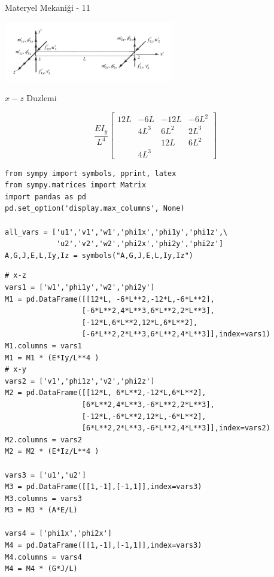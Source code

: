 \documentclass[12pt,fleqn]{article}\usepackage{../../common}
\begin{document}
Materyel Mekaniği - 11


\includegraphics[width=20em]{phy_020_strs_11_01.jpg}


$x-z$ Duzlemi

$$
\frac{EI_y}{L^4}
\left[\begin{array}{cccc}
12L & -6L  & -12L & -6L^2 \\
    & 4L^3 & 6L^2 & 2L^3  \\
    &      & 12L  & 6L^2  \\
                  & 4L^3
\end{array}\right]
$$









\begin{verbatim}
from sympy import symbols, pprint, latex
from sympy.matrices import Matrix
import pandas as pd
pd.set_option('display.max_columns', None)

all_vars = ['u1','v1','w1','phi1x','phi1y','phi1z',\
            'u2','v2','w2','phi2x','phi2y','phi2z']
A,G,J,E,L,Iy,Iz = symbols("A,G,J,E,L,Iy,Iz")
\end{verbatim}

\begin{verbatim}
# x-z
vars1 = ['w1','phi1y','w2','phi2y']
M1 = pd.DataFrame([[12*L, -6*L**2,-12*L,-6*L**2],
                  [-6*L**2,4*L**3,6*L**2,2*L**3],
                  [-12*L,6*L**2,12*L,6*L**2],
                  [-6*L**2,2*L**3,6*L**2,4*L**3]],index=vars1)
M1.columns = vars1
M1 = M1 * (E*Iy/L**4 )
# x-y
vars2 = ['v1','phi1z','v2','phi2z']
M2 = pd.DataFrame([[12*L, 6*L**2,-12*L,6*L**2],
                  [6*L**2,4*L**3,-6*L**2,2*L**3],
                  [-12*L,-6*L**2,12*L,-6*L**2],
                  [6*L**2,2*L**3,-6*L**2,4*L**3]],index=vars2)
M2.columns = vars2
M2 = M2 * (E*Iz/L**4 )

vars3 = ['u1','u2']
M3 = pd.DataFrame([[1,-1],[-1,1]],index=vars3)
M3.columns = vars3
M3 = M3 * (A*E/L)

vars4 = ['phi1x','phi2x']
M4 = pd.DataFrame([[1,-1],[-1,1]],index=vars3)
M4.columns = vars4
M4 = M4 * (G*J/L)
\end{verbatim}
\end{document}
